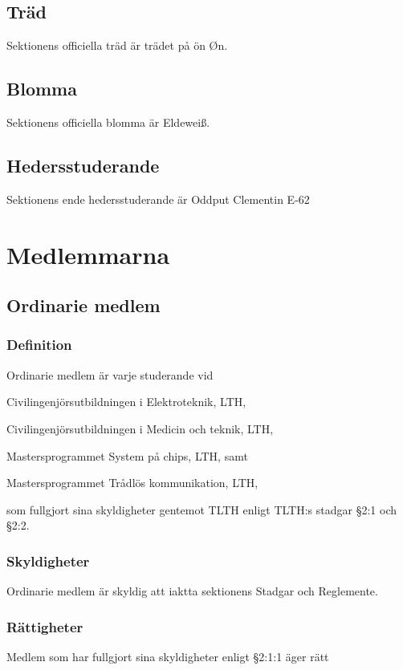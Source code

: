 \documentclass[10pt]{article}
\begin{document}
\subsection{Träd}
Sektionens officiella träd är trädet på ön Øn.
\subsection{Blomma}
Sektionens officiella blomma är Eldewei\ss.
\subsection{Hedersstuderande}
Sektionens ende hedersstuderande är Oddput Clementin E-62
\newpage

\section{Medlemmarna}
\subsection{Ordinarie medlem}
\subsubsection{Definition}
Ordinarie medlem är varje studerande vid
\begin{dashlist}
\item Civilingenjörsutbildningen i Elektroteknik, LTH,
\item Civilingenjörsutbildningen i Medicin och teknik, LTH,
\item Mastersprogrammet System på chips, LTH, samt
\item Mastersprogrammet Trådlös kommunikation, LTH,
\end{dashlist}
som fullgjort sina skyldigheter gentemot TLTH enligt TLTH:s stadgar §2:1 och §2:2.

\subsubsection{Skyldigheter}
Ordinarie medlem är skyldig att iaktta sektionens
Stadgar och Reglemente.

\subsubsection{Rättigheter}
Medlem som har fullgjort sina skyldigheter enligt
§2:1:1 äger rätt
\end{document}

